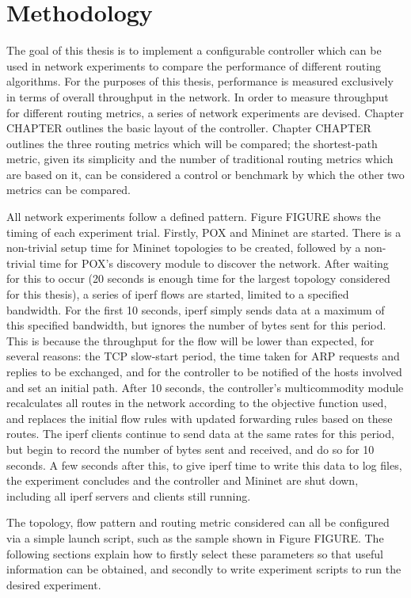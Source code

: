 \chapter{Methodology}

The goal of this thesis is to implement a configurable controller which can be used in network experiments to compare the performance of different routing algorithms. For the purposes of this thesis, performance is measured exclusively in terms of overall throughput in the network. In order to measure throughput for different routing metrics, a series of network experiments are devised. Chapter CHAPTER outlines the basic layout of the controller. Chapter CHAPTER outlines the three routing metrics which will be compared; the shortest-path metric, given its simplicity and the number of traditional routing metrics which are based on it, can be considered a control or benchmark by which the other two metrics can be compared.

All network experiments follow a defined pattern. Figure FIGURE shows the timing of each experiment trial. Firstly, POX and Mininet are started. There is a non-trivial setup time for Mininet topologies to be created, followed by a non-trivial time for POX's discovery module to discover the network. After waiting for this to occur (20 seconds is enough time for the largest topology considered for this thesis), a series of iperf flows are started, limited to a specified bandwidth. For the first 10 seconds, iperf simply sends data at a maximum of this specified bandwidth, but ignores the number of bytes sent for this period. This is because the throughput for the flow will be lower than expected, for several reasons: the TCP slow-start period, the time taken for ARP requests and replies to be exchanged, and for the controller to be notified of the hosts involved and set an initial path. After 10 seconds, the controller's multicommodity module recalculates all routes in the network according to the objective function used, and replaces the initial flow rules with updated forwarding rules based on these routes. The iperf clients continue to send data at the same rates for this period, but begin to record the number of bytes sent and received, and do so for 10 seconds. A few seconds after this, to give iperf time to write this data to log files, the experiment concludes and the controller and Mininet are shut down, including all iperf servers and clients still running.

The topology, flow pattern and routing metric considered can all be configured via a simple launch script, such as the sample shown in Figure FIGURE. The following sections explain how to firstly select these parameters so that useful information can be obtained, and secondly to write experiment scripts to run the desired experiment. 

